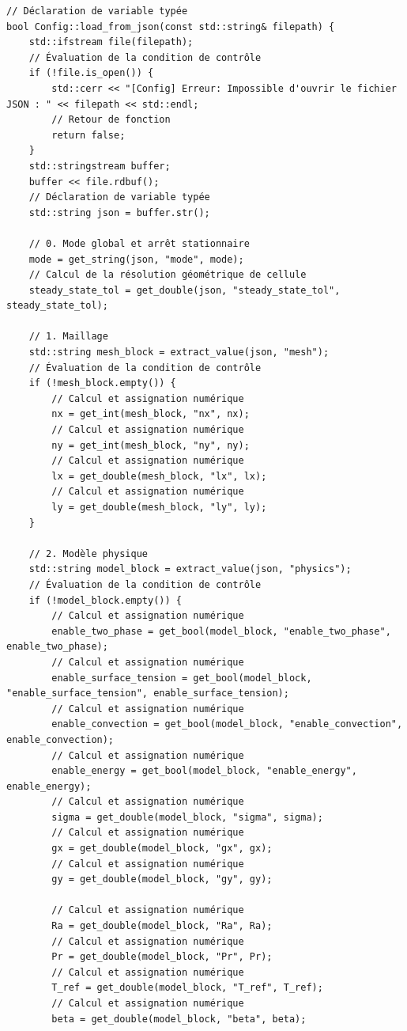 \documentclass[10pt,a4paper,oneside]{book}
\begin{document}
\begin{lstlisting}[language={[11]C++}]
// Déclaration de variable typée
bool Config::load_from_json(const std::string& filepath) {
    std::ifstream file(filepath);
    // Évaluation de la condition de contrôle
    if (!file.is_open()) {
        std::cerr << "[Config] Erreur: Impossible d'ouvrir le fichier JSON : " << filepath << std::endl;
        // Retour de fonction
        return false;
    }
    std::stringstream buffer;
    buffer << file.rdbuf();
    // Déclaration de variable typée
    std::string json = buffer.str();

    // 0. Mode global et arrêt stationnaire
    mode = get_string(json, "mode", mode);
    // Calcul de la résolution géométrique de cellule
    steady_state_tol = get_double(json, "steady_state_tol", steady_state_tol);

    // 1. Maillage
    std::string mesh_block = extract_value(json, "mesh");
    // Évaluation de la condition de contrôle
    if (!mesh_block.empty()) {
        // Calcul et assignation numérique
        nx = get_int(mesh_block, "nx", nx);
        // Calcul et assignation numérique
        ny = get_int(mesh_block, "ny", ny);
        // Calcul et assignation numérique
        lx = get_double(mesh_block, "lx", lx);
        // Calcul et assignation numérique
        ly = get_double(mesh_block, "ly", ly);
    }

    // 2. Modèle physique
    std::string model_block = extract_value(json, "physics");
    // Évaluation de la condition de contrôle
    if (!model_block.empty()) {
        // Calcul et assignation numérique
        enable_two_phase = get_bool(model_block, "enable_two_phase", enable_two_phase);
        // Calcul et assignation numérique
        enable_surface_tension = get_bool(model_block, "enable_surface_tension", enable_surface_tension);
        // Calcul et assignation numérique
        enable_convection = get_bool(model_block, "enable_convection", enable_convection);
        // Calcul et assignation numérique
        enable_energy = get_bool(model_block, "enable_energy", enable_energy);
        // Calcul et assignation numérique
        sigma = get_double(model_block, "sigma", sigma);
        // Calcul et assignation numérique
        gx = get_double(model_block, "gx", gx);
        // Calcul et assignation numérique
        gy = get_double(model_block, "gy", gy);

        // Calcul et assignation numérique
        Ra = get_double(model_block, "Ra", Ra);
        // Calcul et assignation numérique
        Pr = get_double(model_block, "Pr", Pr);
        // Calcul et assignation numérique
        T_ref = get_double(model_block, "T_ref", T_ref);
        // Calcul et assignation numérique
        beta = get_double(model_block, "beta", beta);


\end{lstlisting}
\end{document}

